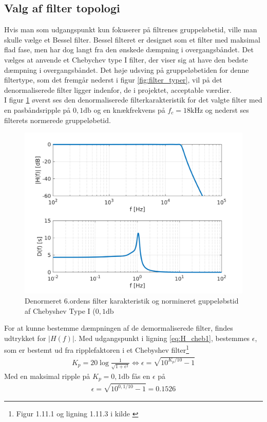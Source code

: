 \subsection{Valg af filter topologi}
Hvis man som udgangspunkt kun fokuserer på filtrenes gruppeløbetid, ville man skulle vælge et Bessel filter. 
Bessel filteret er designet som et filter med maksimal flad fase, men har dog langt fra den ønskede dæmpning i overgangsbåndet.
Det vælges at anvende et Chebychev type I filter, der viser sig at have den bedste dæmpning i overgangsbåndet.
Det høje udsving på gruppeløbetiden for denne filtertype, som det fremgår nederst i figur \ref{fig:filter_typer}, vil på det denormaliserede filter ligger indenfor, de i projektet, acceptable værdier. 
\\
I figur \ref{fig:filter_cheb1_denorm} øverst ses den denormaliserede filterkarakteristik for det valgte filter med en pasbåndsripple på $0,1 \si{\decibel}$ og en knækfrekvens på $f_c = 18 \si{\kilo\hertz}$ og nederst ses filterets normerede gruppeløbetid. 

\begin{figure}[h!]
	\centering
	\includegraphics[width=1\textwidth]{matlab/filter_cheb1_denorm.png}
	\caption{Denormeret 6.ordens filter karakteristik og normineret guppeløbstid af Chebyshev Type I ($0,1 \si{\decibel}$}
	\label{fig:filter_cheb1_denorm}
\end{figure}

For at kunne bestemme dæmpningen af de demormaliserede filter, findes udtrykket for $|H(f)|$.
Med udgangspunkt i ligning \ref{eq:H_cheb1}, bestemmes $\epsilon$, som er bestemt ud fra ripplefaktoren i et Chebyshev filter\footnote{Figur 1.11.1 og ligning 1.11.3 i kilde \cite{anfilter}}
\begin{align}
	K_p = 20 \log \frac{1}{\sqrt{1+\epsilon^2}} \Leftrightarrow \epsilon = \sqrt{10^{K_p/10}-1}
\end{align}
Med en maksimal ripple på $K_p = 0,1 \si{\decibel}$ fås en $\epsilon$ på 
\begin{align}
	\epsilon = \sqrt{10^{0,1/10}-1} = \num{0.1526}
\end{align}

